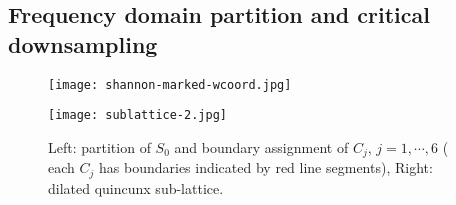 \subsection{Frequency domain partition and critical downsampling}


\begin{figure}[!t]
\centering
\begin{minipage}[c]{.42\textwidth}
\texttt{[image: shannon-marked-wcoord.jpg]}
\end{minipage}\hspace*{3em}
\begin{minipage}[c]{.3\textwidth}
\texttt{[image: sublattice-2.jpg]}
\vspace*{1em}
\end{minipage}
\caption{Left: partition of $S_0$ and boundary assignment of $C_j$, $j = 1,\cdots,6$ ( each $C_j$ has boundaries indicated by red line segments), Right: dilated quincunx sub-lattice. }
\label{fig: partition}
\vspace*{-5mm}
\end{figure}



